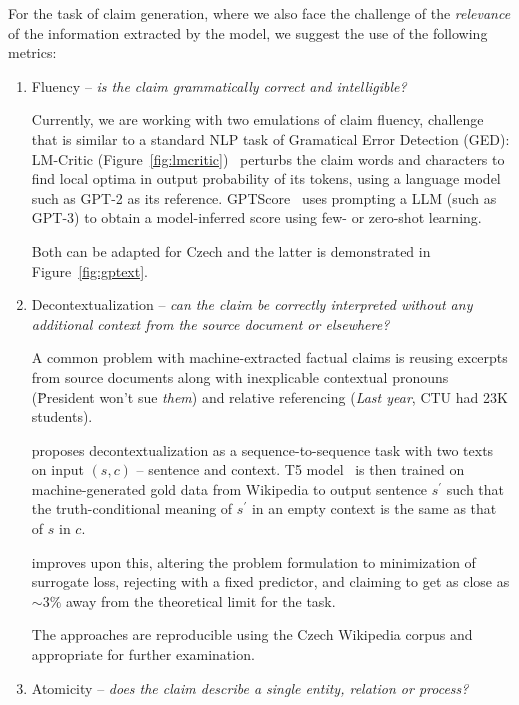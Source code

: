 For the task of claim generation, where we also face the challenge of the \textit{relevance} of the information extracted by the model, we suggest the use of the following metrics:

\begin{enumerate}
    \item {\techbf Fluency} -- \textit{is the claim grammatically correct and intelligible?}
    
    Currently, we are working with two emulations of claim fluency, challenge that is similar to a standard NLP task of Gramatical Error Detection (GED): \textsf{LM-Critic} (Figure~\ref{fig:lmcritic})~\cite{yasunaga-etal-2021-lm} perturbs the claim words and characters to find local optima in output probability of its tokens, using a language model such as GPT-2 as its reference. \textsf{GPTScore}~\cite{fu2023gptscore} uses prompting a LLM (such as GPT-3) to obtain a model-inferred score using few- or zero-shot learning.
    
    Both can be adapted for Czech and the latter is demonstrated in Figure~\ref{fig:gptext}.
    \item {\techbf Decontextualization} -- \textit{can the claim be correctly interpreted without any additional context from the source document or elsewhere?}
    
    A common problem with machine-extracted factual claims is reusing excerpts from source documents along with inexplicable contextual pronouns (\"{President won't sue \textit{them}}) and relative referencing (\"{\textit{Last year}, CTU had 23K students}).

\cite{choi-etal-2021-decontextualization} proposes decontextualization as a sequence-to-sequence task with two texts on input $(s,c)$ -- sentence and context.
    T5 model~\cite{t5-11b} is then trained on machine-generated gold data from Wikipedia to output sentence $s^\prime$ such that the truth-conditional meaning of $s^\prime$ in an empty context is the same as that of $s$ in $c$.

    \cite{mohri2023learning} improves upon this, altering the problem formulation to minimization of surrogate loss, rejecting with a fixed predictor, and claiming to get as close as $\sim3\%$ away from the theoretical limit for the task.

    The approaches are reproducible using the Czech Wikipedia corpus and appropriate for further examination.

    \item {\techbf Atomicity} --  \textit{does the claim describe a single entity, relation or process?}
    \label{atomicity}
    

\end{enumerate}
